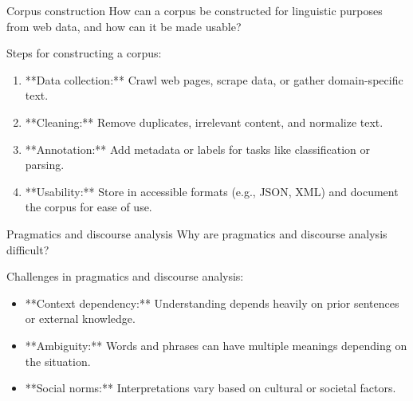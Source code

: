 \documentclass{article}
\begin{document}
\begin{exercise}{Corpus construction}
  How can a corpus be constructed for linguistic purposes from web data, and how can it be made usable?

  \begin{solution}
    Steps for constructing a corpus:
    \begin{enumerate}
        \item **Data collection:** Crawl web pages, scrape data, or gather domain-specific text.
        \item **Cleaning:** Remove duplicates, irrelevant content, and normalize text.
        \item **Annotation:** Add metadata or labels for tasks like classification or parsing.
        \item **Usability:** Store in accessible formats (e.g., JSON, XML) and document the corpus for ease of use.
    \end{enumerate}
  \end{solution}
\end{exercise}

\begin{exercise}{Pragmatics and discourse analysis}
  Why are pragmatics and discourse analysis difficult?

  \begin{solution}
    Challenges in pragmatics and discourse analysis:
    \begin{itemize}
        \item **Context dependency:** Understanding depends heavily on prior sentences or external knowledge.
        \item **Ambiguity:** Words and phrases can have multiple meanings depending on the situation.
        \item **Social norms:** Interpretations vary based on cultural or societal factors.
    \end{itemize}
  \end{solution}
\end{exercise}
\end{document}
